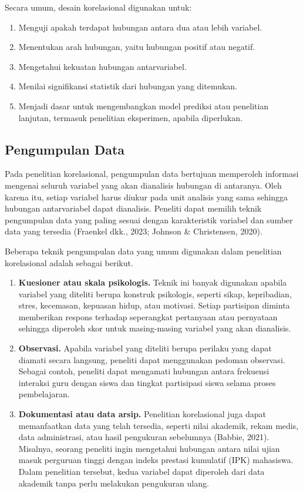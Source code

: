 \documentclass[
  indonesian,
  letterpaper,
  DIV=11,
  numbers=noendperiod]{scrreprt}
\providecommand{\tightlist}{%
  \setlength{\itemsep}{0pt}\setlength{\parskip}{0pt}}
\begin{document}
Secara umum, desain korelasional digunakan untuk:

\begin{enumerate}
\def\labelenumi{\arabic{enumi}.}
\tightlist
\item
  Menguji apakah terdapat hubungan antara dua atau lebih variabel.
\item
  Menentukan arah hubungan, yaitu hubungan positif atau negatif.
\item
  Mengetahui kekuatan hubungan antarvariabel.
\item
  Menilai signifikansi statistik dari hubungan yang ditemukan.
\item
  Menjadi dasar untuk mengembangkan model prediksi atau penelitian
  lanjutan, termasuk penelitian eksperimen, apabila diperlukan.
\end{enumerate}

\subsection{Pengumpulan Data}\label{pengumpulan-data}

Pada penelitian korelasional, pengumpulan data bertujuan memperoleh
informasi mengenai seluruh variabel yang akan dianalisis hubungan di
antaranya. Oleh karena itu, setiap variabel harus diukur pada unit
analisis yang sama sehingga hubungan antarvariabel dapat dianalisis.
Peneliti dapat memilih teknik pengumpulan data yang paling sesuai dengan
karakteristik variabel dan sumber data yang tersedia (Fraenkel dkk.,
2023; Johnson \& Christensen, 2020).

Beberapa teknik pengumpulan data yang umum digunakan dalam penelitian
korelasional adalah sebagai berikut.

\begin{enumerate}
\def\labelenumi{\arabic{enumi}.}
\tightlist
\item
  \textbf{Kuesioner atau skala psikologis.} Teknik ini banyak digunakan
  apabila variabel yang diteliti berupa konstruk psikologis, seperti
  sikap, kepribadian, stres, kecemasan, kepuasan hidup, atau motivasi.
  Setiap partisipan diminta memberikan respons terhadap seperangkat
  pertanyaan atau pernyataan sehingga diperoleh skor untuk masing-masing
  variabel yang akan dianalisis.
\item
  \textbf{Observasi.} Apabila variabel yang diteliti berupa perilaku
  yang dapat diamati secara langsung, peneliti dapat menggunakan pedoman
  observasi. Sebagai contoh, peneliti dapat mengamati hubungan antara
  frekuensi interaksi guru dengan siswa dan tingkat partisipasi siswa
  selama proses pembelajaran.
\item
  \textbf{Dokumentasi atau data arsip.} Penelitian korelasional juga
  dapat memanfaatkan data yang telah tersedia, seperti nilai akademik,
  rekam medis, data administrasi, atau hasil pengukuran sebelumnya
  (Babbie, 2021). Misalnya, seorang peneliti ingin mengetahui hubungan
  antara nilai ujian masuk perguruan tinggi dengan indeks prestasi
  kumulatif (IPK) mahasiswa. Dalam penelitian tersebut, kedua variabel
  dapat diperoleh dari data akademik tanpa perlu melakukan pengukuran
  ulang.
\end{enumerate}
\end{document}
